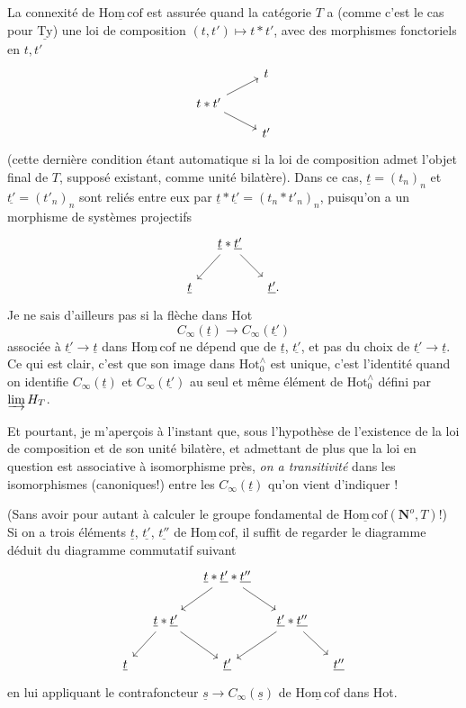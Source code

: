 \documentclass[11pt]{article}
\newcommand{\printedpage}[1]{\marginpar{\footnotesize p.~#1}}
\newcommand{\msp}[1]{\marginpar{\footnotesize [#1]}}
\newcommand{\Hotz}{\mathrm{Hot}^{\wedge}_{0}}
\newcommand{\Hc}{\underline{\mathrm{Hom\,cof}}}
\providecommand{\No}{}\renewcommand{\No}{\mathbf{N}^o}
\begin{document}
La connexité de $\Hc$ est assurée quand la catégorie $T$ a (comme c'est le cas pour $\underline{\mathrm{Ty}}$) une loi de composition $(t,t') \longmapsto t * t'$, avec des morphismes fonctoriels en $t, t'$
\[
\begin{tikzcd}[row sep=small]
 & t \\
t * t' \arrow[ru] \arrow[rd] & \\
 & t'
\end{tikzcd}
\]
(cette dernière condition étant automatique
\printedpage{75}
\msp{page 119}
si la loi de composition admet l'objet final de $T$, supposé existant, comme unité bilatère). Dans ce cas, $\underline{t} = (t_n)_n$ et $\underline{t'} = (t'_n)_n$ sont reliés entre eux par $\underline{t} * \underline{t'} = (t_n * t'_n)_n$, puisqu'on a un morphisme de systèmes projectifs
\[
\begin{tikzcd}[column sep=small]
 & \underline{t} * \underline{t'} \arrow[ld] \arrow[rd] & \\
\underline{t} & & \underline{t'}.
\end{tikzcd}
\]
Je ne sais d'ailleurs pas si la flèche dans Hot
\[
C_\infty(\underline{t}) \longrightarrow C_\infty(\underline{t'})
\]
associée à $\underline{t'} \longrightarrow \underline{t}$ dans $\Hc$ ne dépend que de $\underline{t}$, $\underline{t'}$, et pas du choix de $\underline{t'} \longrightarrow \underline{t}$. Ce qui est clair, c'est que son image dans $\Hotz$ est unique, c'est l'identité quand on identifie $C_\infty(\underline{t})$ et $C_\infty(\underline{t'})$ au seul et même élément de $\Hotz$ défini par $\varinjlim H_T$.

Et pourtant, je m'aperçois à l'instant que, sous l'hypothèse de l'existence de la loi de composition et de son unité bilatère, et admettant de plus que la loi en question est associative à isomorphisme près, \textit{on a transitivité} dans les isomorphismes (canoniques!) entre les $C_\infty(\underline{t})$ qu'on vient d'indiquer !

\msp{page 120}
(Sans avoir pour autant à calculer le groupe fondamental de $\Hc(\No, T)$!) Si on a trois éléments $\underline{t}$, $\underline{t'}$, $\underline{t''}$ de $\Hc$, il suffit de regarder le diagramme déduit du diagramme commutatif suivant
\[
\begin{tikzcd}[column sep=small]
 & & \underline{t} * \underline{t'} * \underline{t''} \arrow[ld] \arrow[rd] & & \\
 & \underline{t} * \underline{t'} \arrow[ld] \arrow[rd] & & \underline{t'} * \underline{t''} \arrow[ld] \arrow[rd] & \\
\underline{t} & & \underline{t'} & & \underline{t''}
\end{tikzcd}
\]
en lui appliquant le contrafoncteur $\underline{s} \longrightarrow C_\infty(\underline{s})$ de $\Hc$ dans Hot.
\end{document}

